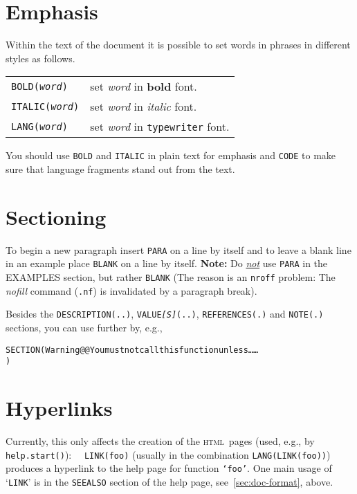 \documentclass[a4paper,11pt]{article}
\newcommand{\HTML}{\textsc{html}}
\begin{document}
\section{Emphasis}
Within the text of the document it is possible to set
words in phrases in different styles as follows.
\begin{center}
\begin{tabular}{ll}
{\tt BOLD(\textit{word})}   & set \emph{word} in \textbf{bold} font. \\
{\tt ITALIC(\textit{word})} & set \emph{word} in \textit{italic} font. \\
{\tt LANG(\textit{word})}   & set \emph{word} in \texttt{typewriter} font. \\
\end{tabular}
\end{center}
You should use \texttt{BOLD} and \texttt{ITALIC} in plain text for emphasis
and \texttt{CODE} to make sure that language fragments stand out from the
text.

\section{Sectioning}
To begin a new paragraph insert \texttt{PARA} on a line by itself
and to leave a blank line in an example place \texttt{BLANK}
on a line by itself.
\textbf{Note:} Do \underline{\emph{not}} use
\texttt{PARA} in the \textsc{EXAMPLES} section, but rather \texttt{BLANK}
({\footnotesize The reason is an \texttt{nroff} problem: The \emph{nofill}
  command (\texttt{.nf}) is invalidated by a paragraph break}).

Besides the \texttt{DESCRIPTION(..)}, \texttt{VALUE\textit{[S]}(..)},
\texttt{REFERENCES(.)} and \texttt{NOTE(.)} sections, you can use further
by, e.g.,
\begin{alltt}
SECTION(Warning @@  You must not call this function unless \ldots\ldots
)
\end{alltt}


\section{Hyperlinks}
Currently, this only affects the creation of the \HTML\ pages (used, e.g.,
by \texttt{help.start()}): \ \
\texttt{LINK(foo)} (usually in the combination \texttt{LANG(LINK(foo))})
produces a hyperlink to the help page for function
\texttt{`foo'}.
One main usage of  `\texttt{LINK}' is in the \texttt{SEEALSO} section of
the help page, see~\ref{sec:doc-format}, above.
\end{document}
